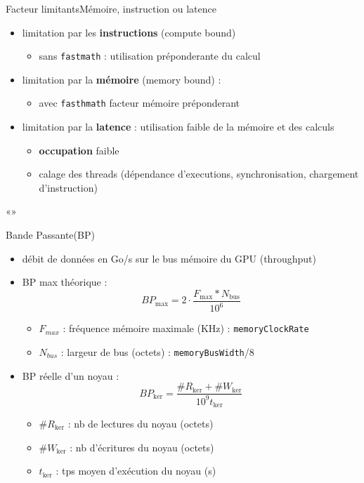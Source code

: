 \documentclass[11pt,mathserif]{beamer}
\begin{document}
\begin{frame}{Facteur limitants}{Mémoire, instruction ou latence}
  \begin{itemize}[<+->]
    \item limitation par les {\bf instructions} (compute bound) 
      \begin{itemize}
        \item sans {\tt fastmath} : utilisation préponderante du calcul
      \end{itemize}
    \item limitation par la {\bf mémoire } (memory bound) : 
      \begin{itemize}
        \item avec {\tt fasthmath} facteur mémoire préponderant
      \end{itemize}
    \item limitation par la {\bf latence} : utilisation faible de la mémoire et des calculs
      \begin{itemize}
        \item {\bf occupation} faible 
        \item calage des threads (dépendance d'executions, synchronisation, chargement d'instruction)
      \end{itemize}
\end{itemize}
\end{frame}
«»
\begin{frame}{Bande Passante(BP)}
  \begin{itemize}[<+->]
    \item débit de données en Go/s sur le bus mémoire du GPU (throughput)
    \item BP max théorique : $$BP_{\mbox{max}} = 2 \cdot \frac{F_{\mbox{max}} * N_{\mbox{bus}}}{10^6} $$
      \begin{itemize}
        \item $F_{max}$ : fréquence mémoire maximale (KHz) : \texttt{memoryClockRate}
        \item $N_{bus}$ : largeur de bus (octets) : \texttt{memoryBusWidth}/8
      \end{itemize}
    \item BP réelle d'un noyau : $$ BP_{\mbox{ker}} = \frac{\# R_{\ker} + \# W_{\ker}}{10^9 t_{\ker}} $$
      \begin{itemize}
        \item $\# R_{\ker}$ : nb de lectures du noyau (octets)
        \item $\# W_{\ker}$ : nb d'écritures du noyau (octets)
        \item $t_{\ker}$ : tps moyen d'exécution du noyau (s)
      \end{itemize}
  \end{itemize}
\end{frame}
\end{document}
